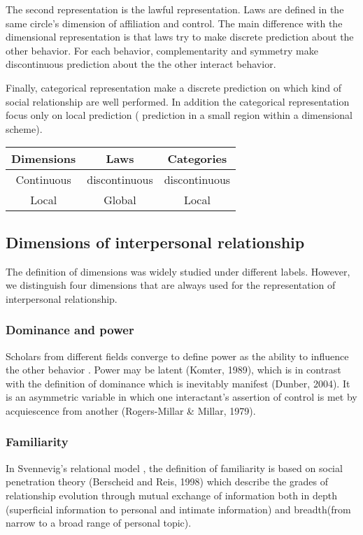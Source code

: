 \documentclass{llncs}
\begin{document}
The second representation is the lawful representation. Laws are defined in the same circle's dimension of affiliation and control. The main difference with the dimensional representation is that laws try to make discrete prediction about the other behavior. For each behavior, complementarity and symmetry make discontinuous prediction about the the other interact behavior. 

Finally, categorical representation  make a discrete prediction on which kind of social relationship are well performed. In addition the categorical representation focus only on local prediction ( prediction in a small region within a dimensional scheme).

\begin{tabular}{|c|c|c|}
  \hline
  Dimensions & Laws & Categories \\
  \hline
  	Continuous &   discontinuous   &   discontinuous  \\
 	Local & Global & Local\\
  \hline
\end{tabular}

\subsection{Dimensions of interpersonal relationship}
The definition of dimensions was widely studied under different labels. However, we distinguish four dimensions that are always used for the representation of interpersonal relationship. 
\subsubsection{Dominance and power}
Scholars from different fields converge to define power as the ability to influence the other behavior \cite{svennevig2000getting}. Power may be latent (Komter, 1989), which is in contrast with the definition of dominance which is inevitably manifest (Dunber, 2004). It is an asymmetric variable in which one interactant's assertion of control is met by acquiescence from another (Rogers-Millar \& Millar, 1979). 
\subsubsection{Familiarity}
In Svennevig’s relational model \cite{svennevig2000getting}, the definition of familiarity is based on social penetration theory (Berscheid and Reis, 1998) which describe the grades of relationship evolution through mutual exchange of information both in depth (superficial information to personal and intimate information) and breadth(from narrow to a broad range of personal topic).   
\end{document}
